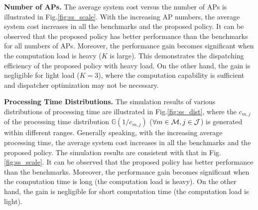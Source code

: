 \textbf{Number of APs.} %
The average system cost versus the number of APs is illustrated in Fig.\ref{fig:ss_scale}.
With the increasing AP numbers, the average system cost increases in all the benchmarks and the proposed policy.
It can be observed that the proposed policy has better performance than the benchmarks for all numbers of APs.
Moreover, the performance gain becomes significant when the computation load is heavy ($K$ is large).
This demonstrates the dispatching efficiency of the proposed policy with heavy load.
On the other hand, the gain is negligible for light load ($K=3$), where the computation capability is sufficient and dispatcher optimization may not be necessary.

\textbf{Processing Time Distributions.}
The simulation results of various distributions of processing time are illustrated in Fig.\ref{fig:ss_dist}, where the $c_{m,j}$ of the processing time distribution $\mathbb{G}(1/c_{m,j})$ ($\forall m\in\mathcal{M},j\in\mathcal{J}$) is generated within different ranges.
Generally speaking, with the increasing average processing time, the average system cost increases in all the benchmarks and the proposed policy.
The simulation results are consistent with that in Fig.\ref{fig:ss_scale}.
It can be observed that the proposed policy has better performance than the benchmarks.
Moreover, the performance gain becomes significant when the computation time is long (the computation load is heavy).
On the other hand, the gain is negligible for short computation time (the computation load is light).


